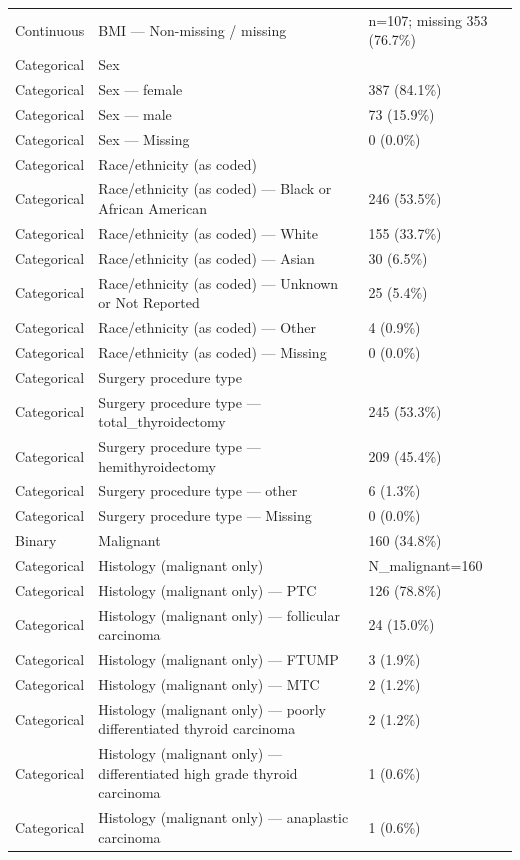 \begin{table}[htbp]
\begin{tabular}{lll}
Continuous & BMI — Non-missing / missing & n=107; missing 353 (76.7\%) \\
Categorical & Sex &  \\
Categorical & Sex — female & 387 (84.1\%) \\
Categorical & Sex — male & 73 (15.9\%) \\
Categorical & Sex — Missing & 0 (0.0\%) \\
Categorical & Race/ethnicity (as coded) &  \\
Categorical & Race/ethnicity (as coded) — Black or African American & 246 (53.5\%) \\
Categorical & Race/ethnicity (as coded) — White & 155 (33.7\%) \\
Categorical & Race/ethnicity (as coded) — Asian & 30 (6.5\%) \\
Categorical & Race/ethnicity (as coded) — Unknown or Not Reported & 25 (5.4\%) \\
Categorical & Race/ethnicity (as coded) — Other & 4 (0.9\%) \\
Categorical & Race/ethnicity (as coded) — Missing & 0 (0.0\%) \\
Categorical & Surgery procedure type &  \\
Categorical & Surgery procedure type — total\_thyroidectomy & 245 (53.3\%) \\
Categorical & Surgery procedure type — hemithyroidectomy & 209 (45.4\%) \\
Categorical & Surgery procedure type — other & 6 (1.3\%) \\
Categorical & Surgery procedure type — Missing & 0 (0.0\%) \\
Binary & Malignant & 160 (34.8\%) \\
Categorical & Histology (malignant only) & N\_malignant=160 \\
Categorical & Histology (malignant only) — PTC & 126 (78.8\%) \\
Categorical & Histology (malignant only) — follicular carcinoma & 24 (15.0\%) \\
Categorical & Histology (malignant only) — FTUMP & 3 (1.9\%) \\
Categorical & Histology (malignant only) — MTC & 2 (1.2\%) \\
Categorical & Histology (malignant only) — poorly differentiated thyroid carcinoma & 2 (1.2\%) \\
Categorical & Histology (malignant only) — differentiated high grade thyroid carcinoma & 1 (0.6\%) \\
Categorical & Histology (malignant only) — anaplastic carcinoma & 1 (0.6\%) \\

\end{tabular}
\end{table}
